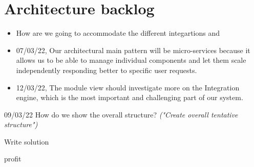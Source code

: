\documentclass[10pt]{article}
\newcommand{\cmark}{\ding{51}}%
\newcommand{\xmark}{\ding{55}}%
\newcommand{\done}{\rlap{$\square$}{\raisebox{2pt}{\large\hspace{1pt}\cmark}}%
\hspace{-2.5pt}}
\newcommand{\wontfix}{\rlap{$\square$}{\large\hspace{1pt}\xmark}}
\begin{document}
\section{Architecture backlog}
\begin{itemize}
    \item How are we going to accommodate the different integartions and 
    \item 07/03/22, Our architectural main pattern will be micro-services because it allows us to be able to manage individual components and let them scale independently responding better to specific user requests. 
    \item 12/03/22, The module view should investigate more on the Integration engine, which is the most important and challenging part of our system.
\end{itemize}


\begin{itemize}
  \begin{todolist}
  \item [09/03/22] How do we show the overall structure? \textit{("Create overall tentative structure")}
  \item Write solution
  \item profit
  \end{todolist}
\end{itemize}
\end{document}
